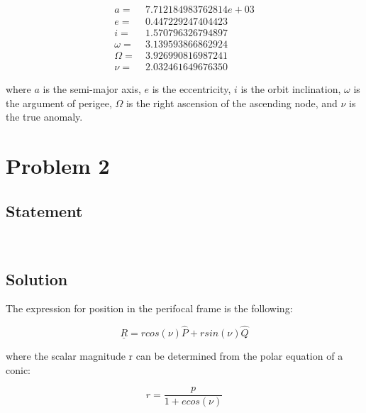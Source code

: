 \documentclass[conf]{new-aiaa}
\begin{document}
\begin{equation}
\begin{aligned}
a = &~ 7.712184983762814e+03 \\ 
e = &~ 0.447229247404423 \\ 
i = &~ 1.570796326794897 \\ 
\omega = &~ 3.139593866862924 \\ 
\Omega = &~ 3.926990816987241 \\ 
\nu = &~ 2.032461649676350  
\end{aligned}
\end{equation}

where $a$ is the semi-major axis, $e$ is the eccentricity, $i$ is the orbit inclination, $\omega$ is the argument of perigee, $\Omega$ is the right ascension of the ascending node, and $\nu$ is the true anomaly. 

\section{Problem 2} 

\subsection{Statement} 
\begin{center}
 \\
\end{center}

\subsection{Solution} 

The expression for position in the perifocal frame is the following: 

\begin{equation}
\underline{R} = r cos (\nu) \hat{P} + r sin (\nu) \hat{Q}
\end{equation}

where the scalar magnitude r can be determined from the polar equation of a conic: 

\begin{equation}
r = \dfrac{p}{1 + e cos(\nu)}
\end{equation}
\end{document}
